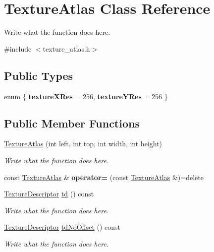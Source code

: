\hypertarget{classTextureAtlas}{\section{Texture\+Atlas Class Reference}
\label{classTextureAtlas}
}


Write what the function does here.  




{\ttfamily \#include $<$texture\+\_\+atlas.\+h$>$}

\subsection*{Public Types}
\begin{DoxyCompactItemize}
\item 
\hypertarget{classTextureAtlas_abbfdf3f234b54498fc3a107eddb6febe}{enum \{ {\bfseries texture\+X\+Res} = 256, 
{\bfseries texture\+Y\+Res} = 256
 \}}\label{classTextureAtlas_abbfdf3f234b54498fc3a107eddb6febe}

\end{DoxyCompactItemize}
\subsection*{Public Member Functions}
\begin{DoxyCompactItemize}
\item 
\hyperlink{classTextureAtlas_a5a0ce2e5d8c48be86fa8a1545610b523}{Texture\+Atlas} (int left, int top, int width, int height)
\begin{DoxyCompactList}\small\item\em Write what the function does here. \end{DoxyCompactList}\item 
\hypertarget{classTextureAtlas_a8c6ecca37b0bf2f2eb490a1cf209dffe}{const \hyperlink{classTextureAtlas}{Texture\+Atlas} \& {\bfseries operator=} (const \hyperlink{classTextureAtlas}{Texture\+Atlas} \&)=delete}\label{classTextureAtlas_a8c6ecca37b0bf2f2eb490a1cf209dffe}

\item 
\hyperlink{structTextureDescriptor}{Texture\+Descriptor} \hyperlink{classTextureAtlas_a30d1c868e881cb9254dad8fb107a8710}{td} () const 
\begin{DoxyCompactList}\small\item\em Write what the function does here. \end{DoxyCompactList}\item 
\hyperlink{structTextureDescriptor}{Texture\+Descriptor} \hyperlink{classTextureAtlas_aad55bc78b471d40ebe02e818f25e9da3}{td\+No\+Offset} () const 
\begin{DoxyCompactList}\small\item\em Write what the function does here. \end{DoxyCompactList}\end{DoxyCompactItemize}
